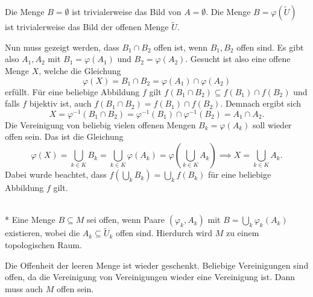 \noindent{}
Die Menge $B=\emptyset$ ist trivialerweise das Bild von
$A=\emptyset$. Die Menge $B=\varphi(\tilde U)$ ist
trivialerweise das Bild der offenen Menge $\tilde U$.

Nun muss gezeigt werden, dass $B_1\cap B_2$ offen ist,
wenn $B_1,B_2$ offen sind. Es gibt also $A_1,A_2$ mit $B_1=\varphi(A_1)$
und $B_2=\varphi(A_2)$. Gesucht ist also eine offene Menge $X$,
welche die Gleichung
\begin{equation}
\varphi(X) = B_1\cap B_2 = \varphi(A_1)\cap\varphi(A_2)
\end{equation}
erfüllt. Für eine beliebige Abbildung $f$ gilt
$f(B_1\cap B_2) \subseteq f(B_1)\cap f(B_2)$ und falls $f$
bijektiv ist, auch $f(B_1\cap B_2)=f(B_1)\cap f(B_2)$. Demnach
ergibt sich
\begin{equation}
X = \varphi^{-1}(B_1\cap B_2) = \varphi^{-1}(B_1)\cap\varphi^{-1}(B_2)
= A_1\cap A_2.
\end{equation}
Die Vereinigung von beliebig vielen offenen Mengen $B_k=\varphi(A_k)$
soll wieder offen sein. Das ist die Gleichung
\begin{equation}
\varphi(X) = \bigcup_{k\in K} B_k = \bigcup_{k\in K} \varphi(A_k)
= \varphi(\bigcup_{k\in K} A_k)
\implies X=\bigcup_{k\in K} A_k.
\end{equation}
Dabei wurde beachtet, dass $f(\bigcup_k B_k) = \bigcup_k f(B_k)$
für eine beliebige Abbildung $f$ gilt.\;\qedsymbol

\begin{theorem}\mbox{}\\*
Eine Menge $B\subseteq M$ sei offen, wenn Paare $(\varphi_k,A_k)$
mit $B=\bigcup_k\varphi_k(A_k)$ existieren, wobei die
$A_k\subseteq\tilde U_k$ offen sind.
Hierdurch wird $M$ zu einem topologischen Raum.
\end{theorem}

\noindent{}
Die Offenheit der leeren Menge ist wieder geschenkt.
Beliebige Vereinigungen sind offen, da die Vereinigung von
Vereinigungen wieder eine Vereinigung ist. Dann muss auch
$M$ offen sein.

